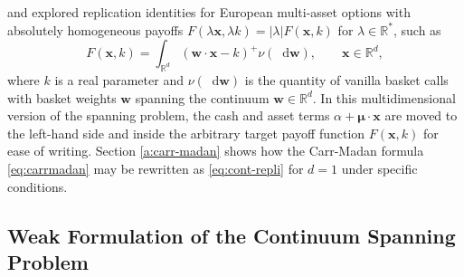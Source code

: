 \documentclass[11pt,A4,twoside]{article}
\numberwithin{equation}{section}
\renewcommand{\vec}{\mathbf}
\renewcommand*\d{\mathop{}\!\mathrm{d}}
\newcommand{\norm}[1]{\left|#1 \right|}
\newcommand{\x}{\mathbf{x}}
\newcommand{\R}{\mathbbm{R}}
\theoremstyle{definition}
\theoremstyle{remark}
\def\R{\mathbb{R}}
\begin{document}
\citet*{bossu-carr-papanicolaou:2022} and \citet*{bossu2021static} explored replication identities for European multi-asset options with 
absolutely homogeneous payoffs
$F(\lambda\vec x, \lambda k) = \norm\lambda F(\x,k)$ for $\lambda\in\R^*$,
such as 
\begin{equation}\label{eq:cont-repli}
        F(\vec x, k) = \int_{\R^d} ( \vec w \cdot \vec x - k )^+  \nu(\d\vec w)  ,
        \qquad \vec x \in \R^d,
    \end{equation} 
where $k$ is a real parameter and
$\nu(\d\vec w)$ is the quantity
of vanilla basket calls with basket weights $\vec w$ spanning the continuum  $\vec w \in \R^d$. In this multidimensional version of the spanning problem, the cash and asset terms $\alpha+ \boldsymbol \mu\cdot\vec x$ are moved to the left-hand side and inside the arbitrary target payoff function $F(\vec x, k)$ for ease of writing. Section \ref{a:carr-madan} shows how the Carr-Madan formula \eqref{eq:carrmadan} may be rewritten as \eqref{eq:cont-repli} for $d=1$ under specific conditions. 



\subsection{Weak Formulation of the Continuum Spanning Problem}
\end{document}

